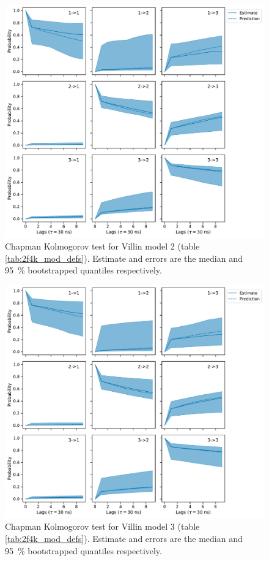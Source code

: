 \documentclass{article}
\begin{document}
\begin{figure}
    \centering
    \includegraphics[height=0.4\textheight]{figures/cktests/villin/m1_logit(dist)_hpix84_cktest.pdf}
    \caption{Chapman Kolmogorov test for Villin model 2 (table \ref{tab:2f4k_mod_defs}). Estimate and errors are the median and \SI{95}{\percent} bootstrapped quantiles respectively. }
    \label{fig:cktest_villin_2}
\end{figure}

\begin{figure}
    \centering
    \includegraphics[height=0.4\textheight]{figures/cktests/villin/m1_dist_hpix56_cktest.pdf}
    \caption{Chapman Kolmogorov test for Villin model 3 (table \ref{tab:2f4k_mod_defs}). Estimate and errors are the median and \SI{95}{\percent} bootstrapped quantiles respectively.}
    \label{fig:cktest_villin_3}
\end{figure}
\end{document}
